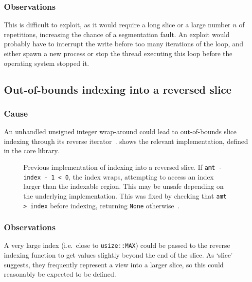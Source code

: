 \documentclass[dissertation.tex]{subfiles}
\begin{document}
\subsubsection{Observations}

This is difficult to exploit, as it would require a long slice or a
large number \(n\) of repetitions, increasing the chance of a
segmentation fault.
An exploit would probably have to interrupt the write before too many
iterations of the loop, and either spawn a new process or stop the
thread executing this loop before the operating system stopped it.


\subsection{Out-of-bounds indexing into a reversed slice}

\subsubsection{Cause}
An unhandled unsigned integer wrap-around could lead to out-of-bounds
slice indexing through its reverse iterator~\cite{rust-pr-reverse}.
 shows the relevant implementation, defined in the
core library.

\begin{figure}[ht]
    
    \caption{
        Previous implementation of indexing into a reversed slice.
        If \texttt{amt - index - 1 < 0}, the index wraps, attempting to
        access an index larger than the indexable region.
        This may be unsafe depending on the underlying implementation.
        This was fixed by checking that \texttt{amt > index} before
        indexing, returning \texttt{None}
        otherwise~\cite{rust-commit-reverse}.
    }
    \label{lst:bug-reverse}
\end{figure}

\subsubsection{Observations}
A very large index (i.e.\ close to \texttt{usize::MAX}) could be passed
to the reverse indexing function to get values slightly beyond the end
of the slice.
As `slice' suggests, they frequently represent a view into a larger
slice, so this could reasonably be expected to be defined.
\end{document}
